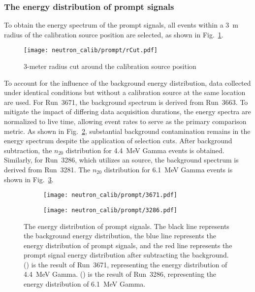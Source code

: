\subsubsection{The energy distribution of prompt signals}
To obtain the energy spectrum of the prompt signals, all events within a \SI{3}{m} radius of the calibration source position are selected, as shown in Fig.~\ref{fig:RtoSource}.
\begin{figure}[htbp]
	\centering
	\texttt{[image: neutron\_calib/prompt/rCut.pdf]}
	\caption{3-meter radius cut around the calibration source position}
	\label{fig:RtoSource}
\end{figure}
To account for the influence of the background energy distribution, data collected under identical conditions but without a calibration source at the same location are used.
For Run~3671, the background spectrum is derived from Run~3663.
To mitigate the impact of differing data acquisition durations, the energy spectra are normalized to live time, allowing event rates to serve as the primary comparison metric.
As shown in Fig.~\ref{fig:3671n20}, substantial background contamination remains in the energy spectrum despite the application of selection cuts.
After background subtraction, the $n_{20}$ distribution for \SI{4.4}{MeV} Gamma events is obtained. Similarly, for Run~3286, which utilizes an  source, the background spectrum is derived from Run~3281. The $n_{20}$ distribution for \SI{6.1}{MeV} Gamma events is shown in Fig.~\ref{fig:3286n20}.
\begin{figure}[htbp]
	\centering
	\begin{subfigure}{0.5\textwidth}
		\centering
		\texttt{[image: neutron\_calib/prompt/3671.pdf]}
		\caption{}
		\label{fig:3671n20}
	\end{subfigure}%
	\begin{subfigure}{0.5\textwidth}
		\centering
		\texttt{[image: neutron\_calib/prompt/3286.pdf]}
		\caption{}
		\label{fig:3286n20}
	\end{subfigure}
	\caption{The energy distribution of prompt signals. The black line represents the background energy distribution, the blue line represents the energy distribution of prompt signals, and the red line represents the prompt signal energy distribution after subtracting the background. () is the result of Run~3671, representing the energy distribution of \SI{4.4}{MeV} Gamma. () is the result of Run~3286, representing the energy distribution of \SI{6.1}{MeV} Gamma.}
	\label{fig:n20}
\end{figure}


